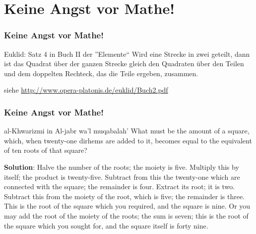 \documentclass{beamer}
\begin{document}
\section{Keine Angst vor Mathe!}

\begin{frame} \frametitle{Keine Angst vor Mathe!}
	\begin{block}{Euklid: Satz 4 in Buch II der ''Elemente``}
		Wird eine Strecke in zwei geteilt, dann ist das Quadrat über der ganzen Strecke gleich den Quadraten über den Teilen und dem doppelten Rechteck, das die Teile ergeben, zusammen.
	\end{block}


	\small siehe \url{http://www.opera-platonis.de/euklid/Buch2.pdf}
\end{frame}

\begin{frame} \frametitle{Keine Angst vor Mathe!}
	\begin{block}{al-Khwarizmi in Al-jabr wa'l muqabalah'}
		\small What must be the amount of a square, which, when twenty-one
		dirhems are added to it, becomes equal to the equivalent of ten
		roots of that square?
		
		\textbf{Solution}: Halve the number of the roots; the moiety is five.
		Multiply this by itself; the product is twenty-five. Subtract from
		this the twenty-one which are connected with the square; the
		remainder is four. Extract its root; it is two. Subtract this from
		the moiety of the root, which is five; the remainder is three. This
		is the root of the square which you required, and the square is
		nine. Or you may add the root of the moiety of the roots; the
		sum is seven; this is the root of the square which you sought for,
		and the square itself is forty nine.
	\end{block}
\end{frame}
\end{document}
